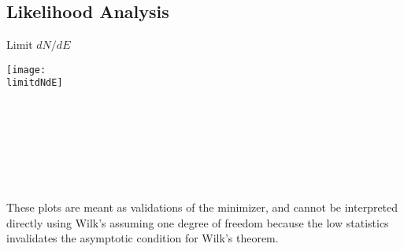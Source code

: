\documentclass[titlepage]{article}
\begin{document}
\subsection{Likelihood Analysis}
\results
\pagebreak

\backgroundpdfplot

\survivialfunctionplot

\pagebreak
{
  \centering

  {\Large Limit $dN/dE$}

  \texttt{[image: \\limitdNdE]}
  \\
  \\

  \tsd

  \\
  \\
  \upperlim

  \\
  \\
  \nsscan
  
  These plots are meant as validations of the minimizer, and cannot be interpreted directly using Wilk's assuming one degree of freedom because the low statistics invalidates the asymptotic condition for Wilk's theorem.
}

\vfill        
\end{document}

